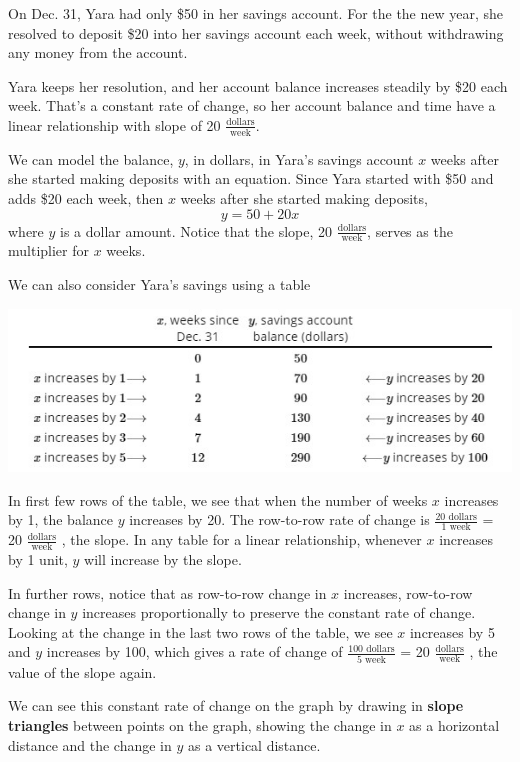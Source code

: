 \documentclass{ximera}
\begin{document}
\begin{example}
On Dec. 31, Yara had only \$50 in her savings account. For the the new year, she resolved to deposit \$20 into her savings account each week, without withdrawing any money from the account. 

Yara keeps her resolution, and her account balance increases steadily by \$20 each week. That's a constant rate of change, so her account balance and time have a linear relationship with slope of 20 $\frac{\text{dollars}}{\text{week}}$.  

We can model the balance, $y$,  in dollars, in Yara's savings account $x$  weeks after she started making deposits with an equation. Since Yara started with \$50  and adds \$20  each week, then $x$  weeks after she started making deposits, $$y=50+20x$$ where $y$  is a dollar amount. Notice that the slope, 20 $\frac{\text{dollars}}{\text{week}}$,  serves as the multiplier for $x$ weeks.

We can also consider Yara's savings using a table

\includegraphics{2-2table8.jpg}

In first few rows of the table, we see that when the number of weeks $x$ increases by 1, the balance $y$  increases by 20.   The row-to-row rate of change is $\frac{\text{20 dollars}}{\text{1 week}}$ = 20 $\frac{\text{dollars}}{\text{week}}$ ,  the slope. In any table for a linear relationship, whenever $x$  increases by 1  unit, $y$  will increase by the slope.

In further rows, notice that as row-to-row change in $x$ increases, row-to-row change in $y$  increases proportionally to preserve the constant rate of change. Looking at the change in the last two rows of the table, we see $x$  increases by 5  and $y$  increases by 100,  which gives a rate of change of  $\frac{\text{100 dollars}}{\text{5 week}}$ = 20 $\frac{\text{dollars}}{\text{week}}$ , the value of the slope again.

We can see this constant rate of change on the graph by drawing in \textbf{slope triangles} between points on the graph, showing the change in $x$ as a horizontal distance and the change in $y$ as a vertical distance.


\end{example}
\end{document}
